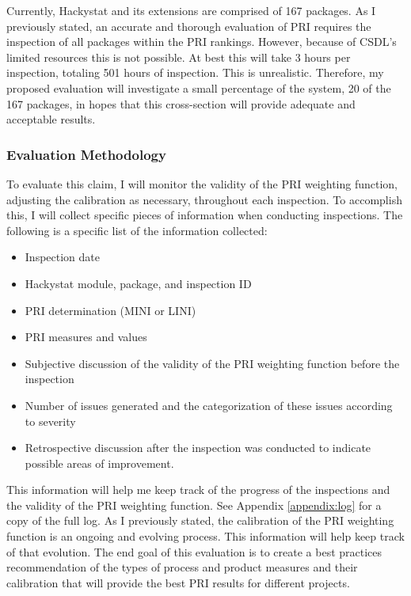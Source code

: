 Currently, Hackystat and its extensions are comprised of 167 packages. As I
previously stated, an accurate and thorough evaluation of PRI requires the
inspection of all packages within the PRI rankings. However, because of
CSDL's limited resources this is not possible. At best this will take 3
hours per inspection, totaling 501 hours of inspection. This is
unrealistic.  Therefore, my proposed evaluation will investigate a small
percentage of the system, 20 of the 167 packages, in hopes that this
cross-section will provide adequate and acceptable results.


\subsubsection{Evaluation Methodology}
To evaluate this claim, I will monitor the validity of the PRI weighting
function, adjusting the calibration as necessary, throughout each
inspection. To accomplish this, I will collect specific pieces of
information when conducting inspections. The following is a specific list
of the information collected:

\begin{itemize}
\item Inspection date
\item Hackystat module, package, and inspection ID
\item PRI determination (MINI or LINI)
\item PRI measures and values
\item Subjective discussion of the validity of the PRI weighting function
  before the inspection
\item Number of issues generated and the categorization of these issues
  according to severity
\item Retrospective discussion after the inspection was conducted to
  indicate possible areas of improvement. 
\end{itemize}

This information will help me keep track of the progress of the inspections
and the validity of the PRI weighting function. See Appendix
\ref{appendix:log} for a copy of the full log. As I previously stated, the
calibration of the PRI weighting function is an ongoing and evolving
process.  This information will help keep track of that evolution.  The end
goal of this evaluation is to create a best practices recommendation of the
types of process and product measures and their calibration that will
provide the best PRI results for different projects.

